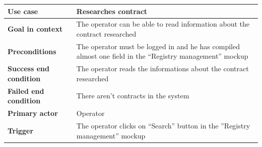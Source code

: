 {{{			\begin{center}
			\begin{tabular}{|p{4cm}|p{10cm}|}
			\hline
				\centering \vspace{1mm} \bfseries{Use case} \vspace{1mm} & 
				\vspace{1mm} Researches contract \vspace{1mm}\\
			\hline
				\centering \vspace{1mm} \bfseries{Goal in context} \vspace{1mm} & 
				\vspace{1mm} The operator can be able to read information about the contract researched \vspace{1mm}\\
			\hline
				\centering \vspace{1mm} \bfseries{Preconditions} \vspace{1mm} & 
				\vspace{1mm} The operator must be logged in and he has compiled almost one field in the “Registry management” mockup \vspace{1mm}\\
			\hline
				\centering \vspace{1mm} \bfseries{Success end condition} \vspace{1mm} & 
				\vspace{1mm} The operator reads the informations about the contract researched \vspace{1mm}\\
			\hline
				\centering \vspace{1mm} \bfseries{Failed end condition} \vspace{1mm} & 
				\vspace{1mm} There aren’t contracts in the system \vspace{1mm}\\
			\hline
				\centering \vspace{1mm} \bfseries{Primary actor} \vspace{1mm} & 
				\vspace{1mm} Operator \vspace{1mm}\\
			\hline
				\centering \vspace{1mm} \bfseries{Trigger} \vspace{1mm} & 
				\vspace{1mm} The operator clicks on “Search” button in the ”Registry management” mockup \vspace{1mm}\\
			\hline
			\end{tabular}


\end{center}}}}
